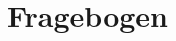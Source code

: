 %
%
\glsresetall

\let\raggedsection\centering 
\chapter{Fragebogen}\label{chap.appendix_fragebogen}
\let\raggedsection\raggedright 
